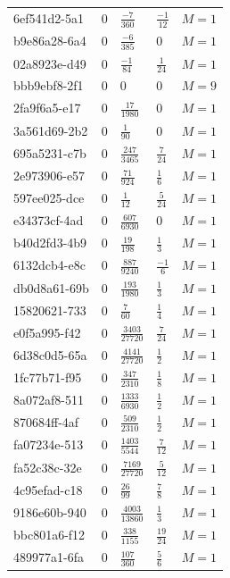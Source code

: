 \documentclass[11pt,twoside,openright]{book}
\begin{document}
\begin{longtable}{p{4.5cm}llll}
6ef541d2-5a1 & $0$ & $\frac{-7}{360}$ & $\frac{-1}{12}$ & $M=1$ \\
b9e86a28-6a4 & $0$ & $\frac{-6}{385}$ & $0$ & $M=1$ \\
02a8923e-d49 & $0$ & $\frac{-1}{84}$ & $\frac{1}{24}$ & $M=1$ \\
bbb9ebf8-2f1 & $0$ & $0$ & $0$ & $M=9$ \\
2fa9f6a5-e17 & $0$ & $\frac{17}{1980}$ & $0$ & $M=1$ \\
3a561d69-2b2 & $0$ & $\frac{1}{90}$ & $0$ & $M=1$ \\
695a5231-c7b & $0$ & $\frac{247}{3465}$ & $\frac{7}{24}$ & $M=1$ \\
2e973906-e57 & $0$ & $\frac{71}{924}$ & $\frac{1}{6}$ & $M=1$ \\
597ee025-dce & $0$ & $\frac{1}{12}$ & $\frac{5}{24}$ & $M=1$ \\
e34373cf-4ad & $0$ & $\frac{607}{6930}$ & $0$ & $M=1$ \\
b40d2fd3-4b9 & $0$ & $\frac{19}{198}$ & $\frac{1}{3}$ & $M=1$ \\
6132dcb4-e8c & $0$ & $\frac{887}{9240}$ & $\frac{-1}{6}$ & $M=1$ \\
db0d8a61-69b & $0$ & $\frac{193}{1980}$ & $\frac{1}{3}$ & $M=1$ \\
15820621-733 & $0$ & $\frac{7}{60}$ & $\frac{1}{4}$ & $M=1$ \\
e0f5a995-f42 & $0$ & $\frac{3403}{27720}$ & $\frac{7}{24}$ & $M=1$ \\
6d38c0d5-65a & $0$ & $\frac{4141}{27720}$ & $\frac{1}{2}$ & $M=1$ \\
1fc77b71-f95 & $0$ & $\frac{347}{2310}$ & $\frac{1}{8}$ & $M=1$ \\
8a072af8-511 & $0$ & $\frac{1333}{6930}$ & $\frac{1}{2}$ & $M=1$ \\
870684ff-4af & $0$ & $\frac{509}{2310}$ & $\frac{1}{2}$ & $M=1$ \\
fa07234e-513 & $0$ & $\frac{1403}{5544}$ & $\frac{7}{12}$ & $M=1$ \\
fa52c38c-32e & $0$ & $\frac{7169}{27720}$ & $\frac{5}{12}$ & $M=1$ \\
4c95efad-c18 & $0$ & $\frac{26}{99}$ & $\frac{7}{8}$ & $M=1$ \\
9186e60b-940 & $0$ & $\frac{4003}{13860}$ & $\frac{1}{3}$ & $M=1$ \\
bbc801a6-f12 & $0$ & $\frac{338}{1155}$ & $\frac{19}{24}$ & $M=1$ \\
489977a1-6fa & $0$ & $\frac{107}{360}$ & $\frac{5}{6}$ & $M=1$ \\

\end{longtable}
\end{document}
